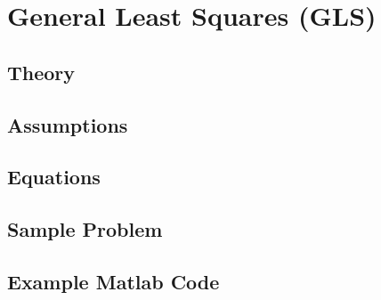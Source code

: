 \section{General Least Squares (GLS)}
\subsection{Theory}
\subsection{Assumptions}
\subsection{Equations}
\subsection{Sample Problem}
\subsection{Example Matlab Code}
